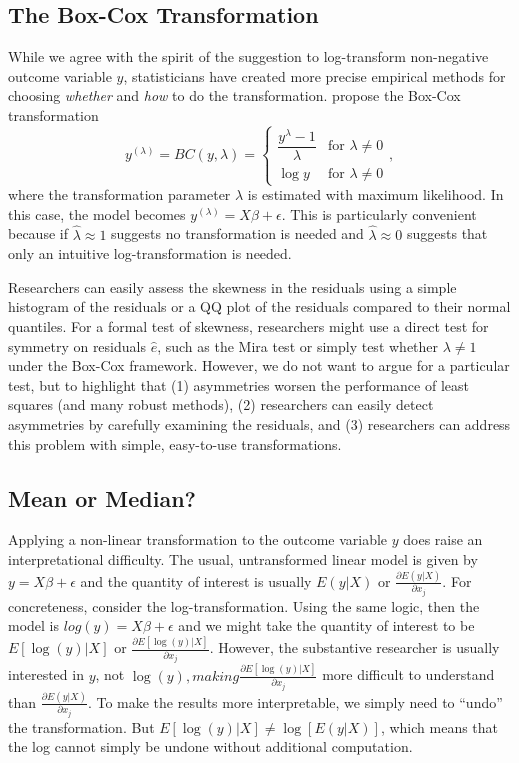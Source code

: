 \documentclass[12pt]{article}
\begin{document}
\subsection*{The Box-Cox Transformation}

While we agree with the spirit of the suggestion to log-transform non-negative outcome variable $y$, statisticians have created more precise empirical methods for choosing \textit{whether} and \textit{how} to do the transformation. 
\cite{BoxCox1964} propose the Box-Cox transformation 
\begin{displaymath}
   y^{(\lambda)} = BC(y, \lambda) = \left\{
     \begin{array}{lr}
       \dfrac{y^\lambda - 1}{\lambda} & \text{for } \lambda \neq 0\\
       \log y & \text{for } \lambda \neq 0
     \end{array}
   \right.,
\end{displaymath}
\noindent where the transformation parameter $\lambda$ is estimated with maximum likelihood. 
In this case, the model becomes $y^{(\lambda)} = X\beta + \epsilon$. 
This is particularly convenient because if $\hat{\lambda} \approx 1$ suggests no transformation is needed and $\hat{\lambda} \approx 0$ suggests that only an intuitive log-transformation is needed.

Researchers can easily assess the skewness in the residuals using a simple histogram of the residuals or a QQ plot of the residuals compared to their normal quantiles. 
For a formal test of skewness, researchers might use a direct test for symmetry on residuals $\hat{e}$, such as the Mira test \citep{Mira1999} or simply test whether $\lambda \neq 1$ under the Box-Cox framework. 
However, we do not want to argue for a particular test, but to highlight that (1) asymmetries worsen the performance of least squares (and many robust methods), (2) researchers can easily detect asymmetries by carefully examining the residuals, and (3) researchers can address this problem with simple, easy-to-use transformations.

\subsection*{Mean or Median?}

Applying a non-linear transformation to the outcome variable $y$ does raise an interpretational difficulty. 
The usual, untransformed linear model is given by $y = X\beta + \epsilon$ and the quantity of interest is usually $E(y | X)$ or $\frac{\partial E(y | X)}{\partial x_j}$. 
For concreteness, consider the log-transformation. 
Using the same logic, then the model is $log(y) = X\beta + \epsilon$ and we might take the quantity of interest to be $E[\log(y) | X]$ or $\frac{\partial E[\log(y) | X]}{\partial x_j}$. 
However, the substantive researcher is usually interested in $y$, not $\log(y), making $$\frac{\partial E[\log(y) | X]}{\partial x_j}$ more difficult to understand than $\frac{\partial E(y | X)}{\partial x_j}$. 
To make the results more interpretable, we simply need to ``undo'' the transformation. 
But $E[\log(y) | X] \neq \log [E(y | X)]$, which means that the log cannot simply be undone without additional computation.
\end{document}

